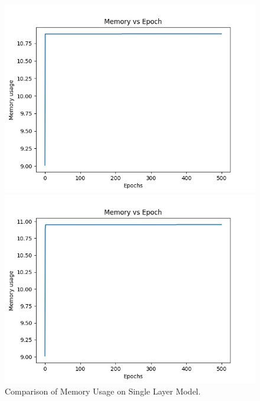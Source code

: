 \documentclass{cup-ino}
\begin{document}
\begin{figure}[h!]
\begin{minipage}{0.47\textwidth}
\includegraphics[width=\linewidth]{images/single_gen_mem.jpeg}
\end{minipage}
\hfill
\begin{minipage}{0.47\textwidth}
\includegraphics[width=\linewidth]{images/single_grad_mem.jpeg}
\end{minipage}

\caption{Comparison of Memory Usage on Single Layer Model.}
\label{fig:singlemem}
\end{figure}
\end{document}
